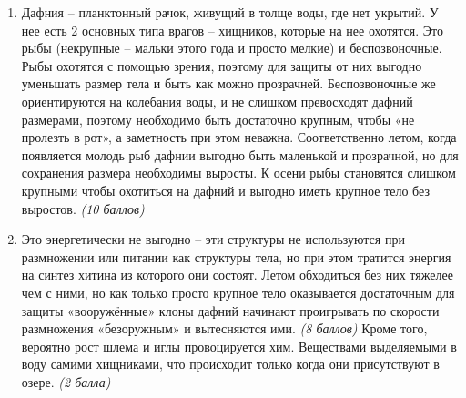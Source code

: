 \solutionSection
\begin{enumerate}
    \item Дафния – планктонный рачок, живущий в толще воды, где нет укрытий. У нее есть 2 основных типа врагов – хищников, которые на нее охотятся. Это рыбы (некрупные – мальки этого года и просто мелкие) и беспозвоночные. Рыбы охотятся с помощью зрения, поэтому для защиты от них выгодно уменьшать размер тела и быть как можно прозрачней. Беспозвоночные же ориентируются на колебания воды, и не слишком превосходят дафний размерами, поэтому необходимо быть достаточно крупным, чтобы «не пролезть в рот», а заметность при этом неважна. Соответственно летом, когда появляется молодь рыб дафнии выгодно быть маленькой и прозрачной, но для сохранения размера необходимы выросты. К осени рыбы становятся слишком крупными чтобы охотиться на дафний и выгодно иметь крупное тело без выростов. \textit{(10 баллов)}
    \item Это энергетически не выгодно – эти структуры не используются при размножении или питании как структуры тела, но при этом тратится энергия на синтез хитина из которого они состоят. Летом обходиться без них тяжелее чем с ними, но как только просто крупное тело оказывается достаточным для защиты «вооружённые» клоны дафний начинают проигрывать по скорости размножения «безоружным» и вытесняются ими. \textit{(8 баллов)} Кроме того, вероятно рост шлема и иглы провоцируется хим. Веществами выделяемыми в воду самими хищниками, что происходит только когда они присутствуют в озере. \textit{(2 балла)}
    \end{enumerate}